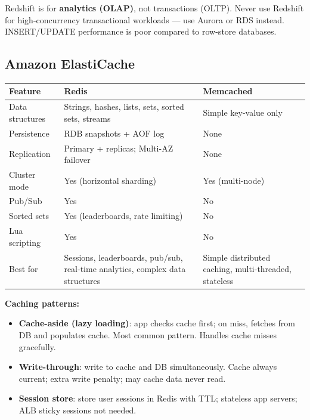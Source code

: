 \begin{gotcha}
Redshift is for \textbf{analytics (OLAP)}, not transactions (OLTP). Never use Redshift for
high-concurrency transactional workloads --- use Aurora or RDS instead.
INSERT/UPDATE performance is poor compared to row-store databases.
\end{gotcha}


\subsection{Amazon ElastiCache}

\begin{comparebox}[title={ElastiCache Redis vs Memcached}]
\begin{tabular}{@{}p{3.5cm}p{4cm}p{4cm}@{}}
\toprule
\textbf{Feature} & \textbf{Redis} & \textbf{Memcached} \\
\midrule
Data structures  & Strings, hashes, lists, sets, sorted sets, streams & Simple key-value only \\
Persistence      & RDB snapshots + AOF log & None \\
Replication      & Primary + replicas; Multi-AZ failover & None \\
Cluster mode     & Yes (horizontal sharding) & Yes (multi-node) \\
Pub/Sub          & Yes & No \\
Sorted sets      & Yes (leaderboards, rate limiting) & No \\
Lua scripting    & Yes & No \\
Best for         & Sessions, leaderboards, pub/sub, real-time analytics,
                   complex data structures & Simple distributed caching,
                   multi-threaded, stateless \\
\bottomrule
\end{tabular}
\end{comparebox}

\textbf{Caching patterns:}
\begin{itemize}
  \item \textbf{Cache-aside (lazy loading)}: app checks cache first; on miss, fetches from DB
        and populates cache. Most common pattern. Handles cache misses gracefully.
  \item \textbf{Write-through}: write to cache and DB simultaneously. Cache always current;
        extra write penalty; may cache data never read.
  \item \textbf{Session store}: store user sessions in Redis with TTL; stateless app servers;
        ALB sticky sessions not needed.
\end{itemize}

